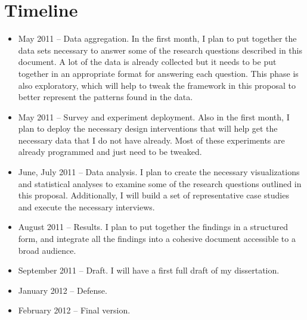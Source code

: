 \section{Timeline}
\begin{itemize}
\item May 2011 -- Data aggregation. In the first month, I plan to put together the data sets necessary to answer some of the research questions described in this document. A lot of the data is already collected but it needs to be put together in an appropriate format for answering each question. This phase is also exploratory, which will help to tweak the framework in this proposal to better represent the patterns found in the data.
\item May 2011 -- Survey and experiment deployment. Also in the first month, I plan to deploy the necessary design interventions that will help get the necessary data that I do not have already. Most of these experiments are already programmed and just need to be tweaked.
\item June, July 2011 -- Data analysis. I plan to create the necessary visualizations and statistical analyses to examine some of the research questions outlined in this proposal. Additionally, I will build a set of representative case studies and execute the necessary interviews.
\item August 2011 -- Results. I plan to put together the findings in a structured form, and integrate all the findings into a cohesive document accessible to a broad audience.
\item September 2011 -- Draft. I will have a first full draft of my dissertation.
\item January 2012 -- Defense.
\item February 2012 -- Final version.
\end{itemize}
